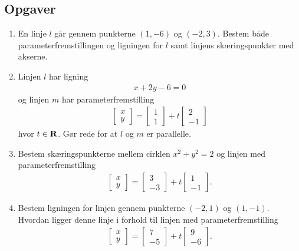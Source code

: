 \subsection{Opgaver}
\begin{enumerate}
	\item En linje $l$ går gennem punkterne $(1,-6)$ og $(-2,3)$. Bestem både parameterfremstillingen og ligningen for $l$ samt linjens skæringspunkter med akserne.
	
	\item Linjen $l$ har ligning 
	\begin{align*}
	x+2y-6=0
	\end{align*}
	og linjen $m$ har parameterfremstilling
	\begin{align*}
	\begin{bmatrix}
	x\\y
	\end{bmatrix}= \begin{bmatrix}
	1\\1
	\end{bmatrix}+t \begin{bmatrix}
	2\\-1
	\end{bmatrix}
	\end{align*}
	hvor $t\in \mathbf{R}$. Gør rede for at $l$ og $m$ er parallelle.
	
	\item Bestem skæringspunkterne mellem cirklen $x^2+y^2=2$ og linjen med parameterfremstilling
	\begin{align*}
	\begin{bmatrix}
	x\\y
	\end{bmatrix}= \begin{bmatrix}
	3\\-3
	\end{bmatrix}+t \begin{bmatrix}
	1\\-1
	\end{bmatrix}.
	\end{align*}
	
	\item Bestem ligningen for linjen gennem punkterne $(-2,1)$ og $(1,-1)$. Hvordan ligger denne linje i forhold til linjen med parameterfremstilling
	\begin{align*}
	\begin{bmatrix}
	x\\y
	\end{bmatrix}= \begin{bmatrix}
	7\\-5
	\end{bmatrix}+t \begin{bmatrix}
	9\\-6
	\end{bmatrix}.
	\end{align*}
	

\end{enumerate}
